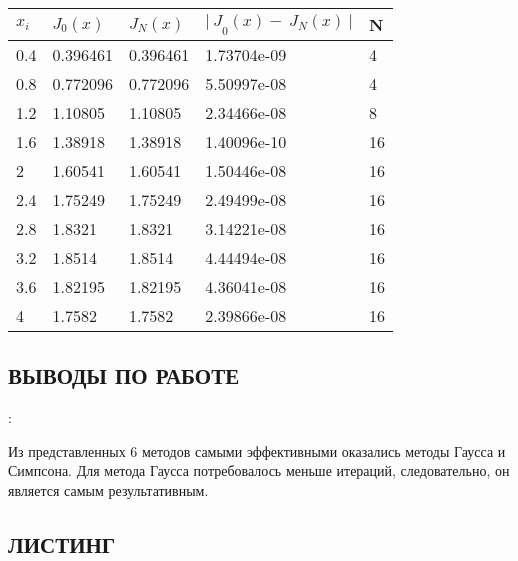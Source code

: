 \documentclass[12pt,a4paper]{report}
\begin{document}
{	\begin{center}
		\begin{tabular}{ | l | l | l | l | l | }
			\hline
			$x_i$	& $J_0(x)$	& $J_N(x)$	& ${|\ J}_0\left(x\right)-\ J_N\left(x\right)\ |$	& N\\
			\hline
			0.4	    & 0.396461	& 0.396461	& 1.73704e-09	                                    & 4\\
			\hline
			0.8 	& 0.772096	& 0.772096	& 5.50997e-08	                                    & 4\\
			\hline
			1.2 	& 1.10805	& 1.10805	& 2.34466e-08	                                    & 8\\
			\hline
			1.6 	& 1.38918	& 1.38918	& 1.40096e-10	                                    & 16\\
			\hline
			2   	& 1.60541	& 1.60541	& 1.50446e-08	                                    & 16\\
			\hline
			2.4 	& 1.75249	& 1.75249	& 2.49499e-08	                                    & 16\\
			\hline
			2.8 	& 1.8321	& 1.8321	& 3.14221e-08	                                    & 16\\
			\hline
			3.2 	& 1.8514	& 1.8514	& 4.44494e-08	                                    & 16\\
			\hline
			3.6 	& 1.82195	& 1.82195	& 4.36041e-08	                                    & 16\\
			\hline
			4	    & 1.7582	& 1.7582	& 2.39866e-08	                                    & 16\\
			\hline
		\end{tabular}
	\end{center}
	
	\begin{center}
		\chapter*{ВЫВОДЫ ПО РАБОТЕ}:
	\end{center}
	
	Из представленных 6 методов самыми эффективными оказались методы Гаусса и Симпсона. Для метода Гаусса потребовалось меньше итераций, следовательно, он является самым результативным.
	
	\begin{center}
		\chapter*{ЛИСТИНГ}
	\end{center}
}
	\fontsize{10}{12}\selectfont
	
\end{document}
